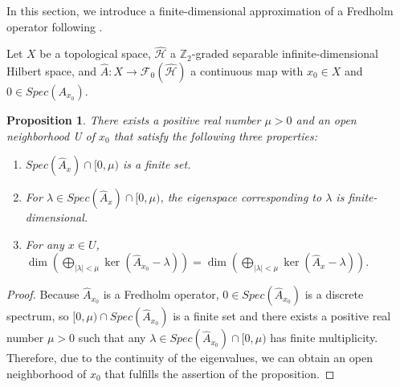 \documentclass{amsart}
\newtheorem{prop}[thm]{Proposition}
\theoremstyle{definition}
\theoremstyle{remark}
\begin{document}
In this section, we introduce a finite-dimensional approximation of a Fredholm operator following \cite{G2}.

Let $X$ be a topological space, $\hat{\mathcal{H}}$ a $\mathbb{Z}_2$-graded separable infinite-dimensional Hilbert space, and 
$\hat{A} \colon X\to \mathcal{F}_0(\hat{\mathcal{H}})$ a continuous map with $x_0 \in X$ and $0\in Spec(A_{x_0}).$

\begin{prop} \label{prop:mu exist}
There exists a positive real number $\mu >0$ and an open neighborhood U of $x_0$ that satisfy the following three properties:
\begin{enumerate}
\item $Spec(\hat{A}_x)\cap [0, \mu)$ is a finite set.
\item For $\lambda \in Spec(\hat{A}_x)\cap [0, \mu)$, the eigenspace corresponding to $\lambda$ is finite-dimensional.
\item For any $x \in U$, $\dim(\bigoplus_{|\lambda|<\mu}\ker(\hat{A}_{x_0}-\lambda))=\dim(\bigoplus_{\lvert \lambda\rvert<\mu}\ker(\hat{A}_{x}-\lambda)).$
\end{enumerate}
\end{prop}

\begin{proof}
Because $\hat{A}_{x_0}$ is a Fredholm operator, $0\in Spec(\hat{A}_{x_0})$ is a discrete spectrum, so $[0, \mu)\cap Spec(\hat{A}_{x_0})$
is a finite set and there exists a positive real number $\mu>0$ such that any $\lambda \in Spec(\hat{A}_{x_0})\cap [0, \mu)$ has finite multiplicity.
Therefore, due to the continuity of the eigenvalues, we can obtain an open neighborhood of $x_0$ that fulfills the assertion of the proposition.
\end{proof}
\end{document}
